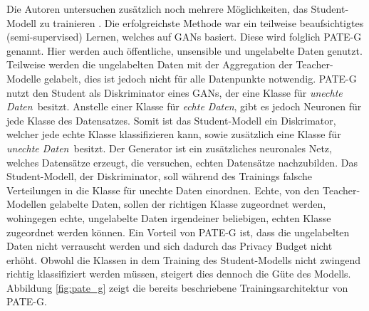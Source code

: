 Die Autoren untersuchen zusätzlich noch mehrere Möglichkeiten, das Student-Modell zu trainieren \cite{P-57}.
Die erfolgreichste Methode war ein teilweise beaufsichtigtes (semi-supervised) Lernen, welches auf GANs basiert.
Diese wird folglich PATE-G genannt.
Hier werden auch öffentliche, unsensible und ungelabelte Daten genutzt.
Teilweise werden die ungelabelten Daten mit der Aggregation der Teacher-Modelle gelabelt, dies ist jedoch nicht für alle Datenpunkte notwendig.
PATE-G nutzt den Student als Diskriminator eines GANs, der eine Klasse für \dq\textit{unechte Daten}\dq\ besitzt. 
Anstelle einer Klasse für \dq\textit{echte Daten}\dq, gibt es jedoch Neuronen für jede Klasse des Datensatzes.
Somit ist das Student-Modell ein Diskrimator, welcher jede echte Klasse klassifizieren kann, sowie zusätzlich eine Klasse für \dq\textit{unechte Daten}\dq\ besitzt.
Der Generator ist ein zusätzliches neuronales Netz, welches Datensätze erzeugt, die versuchen, echten Datensätze nachzubilden.
Das Student-Modell, der Diskriminator, soll während des Trainings falsche Verteilungen in die Klasse für unechte Daten einordnen.
Echte, von den Teacher-Modellen gelabelte Daten, sollen der richtigen Klasse zugeordnet werden, wohingegen echte, ungelabelte Daten irgendeiner beliebigen, echten Klasse zugeordnet werden können.
Ein Vorteil von PATE-G ist, dass die ungelabelten Daten nicht verrauscht werden und sich dadurch das Privacy Budget nicht erhöht.
Obwohl die Klassen in dem Training des Student-Modells nicht zwingend richtig klassifiziert werden müssen, steigert dies dennoch die Güte des Modells.
Abbildung \ref{fig:pate_g} zeigt die bereits beschriebene Trainingsarchitektur von PATE-G.






